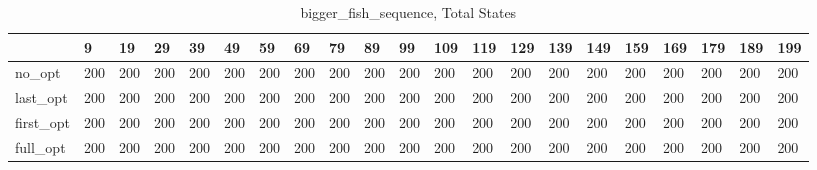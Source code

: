 \begin{table}
\caption{bigger_fish_sequence, Total States}
\label{bigger_fish_sequence_total}
\begin{tabular}{lllllllllllllllllllll}
\toprule
 & 9 & 19 & 29 & 39 & 49 & 59 & 69 & 79 & 89 & 99 & 109 & 119 & 129 & 139 & 149 & 159 & 169 & 179 & 189 & 199 \\
\midrule
no_opt & 200 & 200 & 200 & 200 & 200 & 200 & 200 & 200 & 200 & 200 & 200 & 200 & 200 & 200 & 200 & 200 & 200 & 200 & 200 & 200 \\
last_opt & 200 & 200 & 200 & 200 & 200 & 200 & 200 & 200 & 200 & 200 & 200 & 200 & 200 & 200 & 200 & 200 & 200 & 200 & 200 & 200 \\
first_opt & 200 & 200 & 200 & 200 & 200 & 200 & 200 & 200 & 200 & 200 & 200 & 200 & 200 & 200 & 200 & 200 & 200 & 200 & 200 & 200 \\
full_opt & 200 & 200 & 200 & 200 & 200 & 200 & 200 & 200 & 200 & 200 & 200 & 200 & 200 & 200 & 200 & 200 & 200 & 200 & 200 & 200 \\
\bottomrule
\end{tabular}
\end{table}
